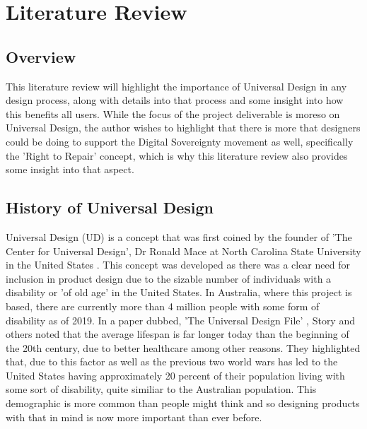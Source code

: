 
\chapter{Literature Review} %

\label{Chapter2} %


\section{Overview} %

This literature review will highlight the importance of Universal Design in any design process, along with details into that process and some insight into how this benefits all users.
While the focus of the project deliverable is moreso on Universal Design, the author wishes to highlight that there is more that designers could be doing to support the Digital Sovereignty movement as well, specifically the 'Right to Repair' concept, which is why this literature review also provides some insight into that aspect.


\section{History of Universal Design}
Universal Design (UD) is a concept that was first coined by the founder of 'The Center for Universal Design', Dr Ronald Mace at North Carolina State University in the United States \cite{ronald}.
This concept was developed as there was a clear need for inclusion in product design due to the sizable number of individuals with a disability or 'of old age' in the United States.
In Australia, where this project is based, there are currently more than 4 million people with some form of disability \cite{ausstats} as of 2019. 
In a paper dubbed, 'The Universal Design File' \cite{universalfile}, Story and others noted that the average lifespan is far longer today than the beginning of the 20th century, due to better healthcare among other reasons.
They highlighted that, due to this factor as well as the previous two world wars has led to the United States having approximately 20 percent of their population living with some sort of disability, quite similiar to the Australian population.
This demographic is more common than people might think and so designing products with that in mind is now more important than ever before.

